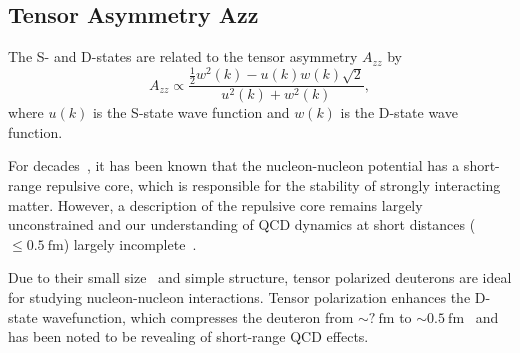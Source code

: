 \subsection{Tensor Asymmetry Azz}


The S- and D-states are related to the tensor asymmetry $A_{zz}$ by~\cite{Frankfurt:1988nt}
\begin{equation}
	A_{zz} \propto \frac{\frac{1}{2}w^2(k)-u(k)w(k)\sqrt{2}}{u^2(k)+w^2(k)},
\end{equation}
where $u(k)$ is the S-state wave function and $w(k)$ is the D-state wave function.

For decades~\cite{PhysRev.81.165}, it has been known that the nucleon-nucleon potential has a short-range repulsive core, which is responsible for the stability of strongly interacting matter. However, a description of the repulsive core remains largely unconstrained and our understanding of QCD dynamics at short distances ($\leq 0.5\mathrm{~fm}$) largely incomplete~\cite{Sargsian:2014bwa}. 

Due to their small size~\cite{needed} and simple structure, tensor polarized deuterons are ideal for studying nucleon-nucleon interactions. Tensor polarization enhances the D-state wavefunction, which compresses the deuteron from $\sim?\mathrm{~fm}$ to $\sim0.5\mathrm{~fm}$~\cite{Forest:1996kp} and has been noted to be revealing of short-range QCD effects.
